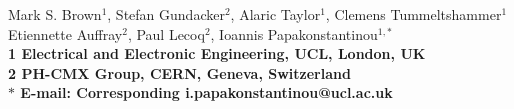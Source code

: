 Mark S. Brown${}^1$, Stefan Gundacker${}^2$, Alaric Taylor${}^1$,
Clemens Tummeltshammer${}^1$\\Etiennette Auffray${}^2$, Paul
Lecoq${}^2$, Ioannis Papakonstantinou${}^{1,\ast}$
\\
\bf{1} Electrical and Electronic Engineering, UCL, London, UK
\\
\bf{2} PH-CMX Group, CERN, Geneva, Switzerland
\\
$\ast$ E-mail: Corresponding i.papakonstantinou@ucl.ac.uk